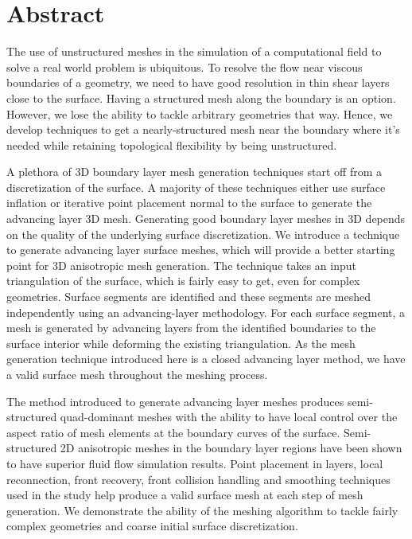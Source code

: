 
\chapter{Abstract}

The use of unstructured meshes in the simulation of a computational field to solve a real world problem is ubiquitous. To resolve the flow near viscous boundaries of a geometry, we need to have good resolution in thin shear layers close to the surface. Having a structured mesh along the boundary is an option. However, we lose the ability to tackle arbitrary geometries that way. Hence, we develop techniques to get a nearly-structured mesh near the boundary where it's needed while retaining topological flexibility by being unstructured.

A plethora of 3D boundary layer mesh generation techniques start off from a discretization of the surface. A majority of these techniques either use surface inflation or iterative point placement normal to the surface to generate the advancing layer 3D mesh. Generating good boundary layer meshes in 3D depends on the quality of the underlying surface discretization. We introduce a technique to generate advancing layer surface meshes, which will provide a better starting point for 3D anisotropic mesh generation. The technique takes an input triangulation of the surface, which is fairly easy to get, even for complex geometries. Surface segments are identified and these segments are meshed independently using an advancing-layer methodology. For each surface segment, a mesh is generated by advancing layers from the identified boundaries to the surface interior while deforming the existing triangulation. As the mesh generation technique introduced here is a closed advancing layer method, we have a valid surface mesh throughout the meshing process.

The method introduced to generate advancing layer meshes produces semi-structured quad-dominant meshes with the ability to have local control over the aspect ratio of mesh elements at the boundary curves of the surface. Semi-structured 2D anisotropic meshes in the boundary layer regions have been shown to have superior fluid flow simulation results. Point placement in layers, local reconnection, front recovery, front collision handling and smoothing techniques used in the study help produce a valid surface mesh at each step of mesh generation. We demonstrate the ability of the meshing algorithm to tackle fairly complex geometries and coarse initial surface discretization.

